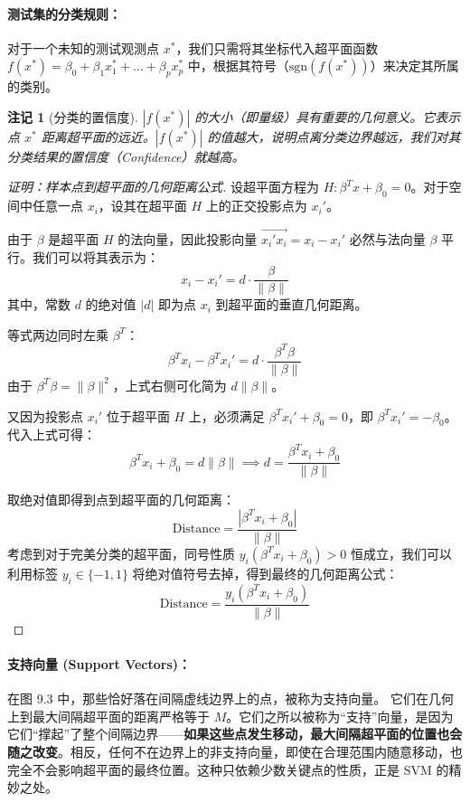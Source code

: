 \documentclass[UTF8]{ctexart}
\newtheorem{remark}{注记}[section]
\numberwithin{equation}{section}
\begin{document}
\paragraph{测试集的分类规则：}
对于一个未知的测试观测点 $x^*$，我们只需将其坐标代入超平面函数 $f(x^*) = \beta_0 + \beta_1 x_1^* + \dots + \beta_p x_p^*$ 中，根据其符号（$\text{sgn}(f(x^*))$）来决定其所属的类别。

\begin{remark}[分类的置信度]
$|f(x^*)|$ 的大小（即量级）具有重要的几何意义。它表示点 $x^*$ 距离超平面的远近。$|f(x^*)|$ 的值越大，说明点离分类边界越远，我们对其分类结果的置信度（Confidence）就越高。
\end{remark}



\begin{proof}[证明：样本点到超平面的几何距离公式]


设超平面方程为 $H: \beta^T x + \beta_0 = 0$。对于空间中任意一点 $x_i$，设其在超平面 $H$ 上的正交投影点为 $x_i'$。

由于 $\beta$ 是超平面 $H$ 的法向量，因此投影向量 $\vec{x_i' x_i} = x_i - x_i'$ 必然与法向量 $\beta$ 平行。我们可以将其表示为：
\[ x_i - x_i' = d \cdot \frac{\beta}{\|\beta\|} \]
其中，常数 $d$ 的绝对值 $|d|$ 即为点 $x_i$ 到超平面的垂直几何距离。

等式两边同时左乘 $\beta^T$：
\[ \beta^T x_i - \beta^T x_i' = d \cdot \frac{\beta^T \beta}{\|\beta\|} \]
由于 $\beta^T \beta = \|\beta\|^2$，上式右侧可化简为 $d \|\beta\|$。

又因为投影点 $x_i'$ 位于超平面 $H$ 上，必须满足 $\beta^T x_i' + \beta_0 = 0$，即 $\beta^T x_i' = -\beta_0$。代入上式可得：
\[ \beta^T x_i + \beta_0 = d \|\beta\| \implies d = \frac{\beta^T x_i + \beta_0}{\|\beta\|} \]

取绝对值即得到点到超平面的几何距离：
\[ \text{Distance} = \frac{|\beta^T x_i + \beta_0|}{\|\beta\|} \]
考虑到对于完美分类的超平面，同号性质 $y_i(\beta^T x_i + \beta_0) > 0$ 恒成立，我们可以利用标签 $y_i \in \{-1, 1\}$ 将绝对值符号去掉，得到最终的几何距离公式：
\begin{equation}
 \text{Distance} = \frac{y_i(\beta^T x_i + \beta_0)}{\|\beta\|} \label{eq:distance_hyperplane_to_point}
\end{equation}
\end{proof}

\paragraph{支持向量 (Support Vectors)：}
在图 9.3 中，那些恰好落在间隔虚线边界上的点，被称为支持向量。
它们在几何上到最大间隔超平面的距离严格等于 $M$。它们之所以被称为“支持”向量，是因为它们“撑起”了整个间隔边界——\textbf{如果这些点发生移动，最大间隔超平面的位置也会随之改变}。相反，任何不在边界上的非支持向量，即使在合理范围内随意移动，也完全不会影响超平面的最终位置。这种只依赖少数关键点的性质，正是 SVM 的精妙之处。
\end{document}
